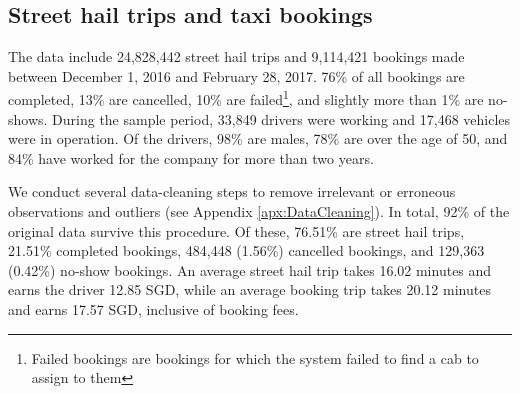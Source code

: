 \documentclass[reviewmode,AEJ]{AEA}
\begin{document}
\subsection{Street hail trips and taxi bookings}
The data include 24,828,442 street hail trips and 9,114,421 bookings made between December 1, 2016 and
February 28, 2017. 76\% of all bookings are 
completed, 13\% are cancelled, 10\% are failed\footnote{Failed bookings are bookings for which the system failed to find a cab to assign to them}, and slightly more than 1\% are no-shows.
During the sample period, 33,849 drivers were working and 17,468 vehicles were in operation.
Of the drivers, 98\% are males, 78\% are over the age of 50, and 84\% have worked for the company for more than
two years.



We conduct several data-cleaning steps to remove irrelevant or erroneous observations and outliers (see Appendix \ref{apx:DataCleaning}).
In total, 92\% of the original data survive this procedure. Of these, 76.51\% are
street hail trips, 21.51\% completed bookings, 484,448 (1.56\%) cancelled bookings, and 129,363 (0.42\%) no-show
bookings. An average street hail trip takes 16.02 minutes and earns the driver 12.85 SGD, while an average  
booking trip takes 20.12 minutes and earns 17.57 SGD, inclusive of booking fees.
\end{document}
